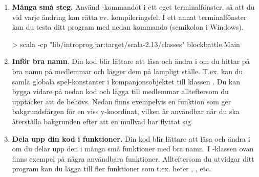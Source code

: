 \begin{enumerate}[leftmargin=*]
  \item \textbf{Många små steg.} Använd -kommandot  i ett eget terminalfönster, så att du vid varje ändring kan rätta ev. kompileringsfel. I ett annat terminalfönster kan du testa ditt program med nedan kommando (semikolon i Windows).
\begin{REPLnonum}
> scala -cp "lib/introprog.jar:target/scala-2.13/classes" blockbattle.Main
\end{REPLnonum}

  \item \textbf{Inför bra namn}. Din kod blir lättare att läsa och ändra i om du hittar på bra namn på medlemmar och lägger dem på lämpligt ställe. T.ex. kan du samla globala spel-konstanter i kompanjonsobjektet till klassen . Du kan bygga vidare på nedan kod och lägga till medlemmar allteftersom du upptäcker att de behövs. Nedan finns exempelvis en funktion som ger bakgrundsfärgen för en viss y-koordinat, vilken är användbar när du ska återställa bakgrunden efter att en mullvad har flyttat sig.
%
%
%
%
%
%
%

 \item \textbf{Dela upp din kod i funktioner.} Din kod blir lättare att läsa och ändra i om du delar upp den i många små funktioner med bra namn. I -klassen ovan finns exempel på några användbara funktioner. Allteftersom du utvidgar ditt program kan du lägga till fler funktioner som t.ex. heter , , etc.


\end{enumerate}
